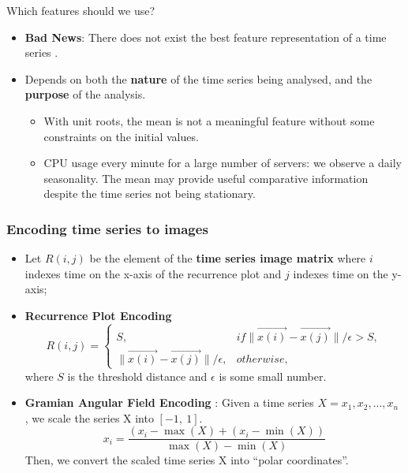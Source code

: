 \documentclass[10pt,aspectratio=43]{beamer}
\begin{document}
\begin{frame}{Which features should we use?}

  \begin{itemize}
  \item \textbf{Bad News}: There does not exist the best feature representation of a time series
    \citep{fulcher2018feature}.
  \item
    Depends on both the \textbf{nature} of the time series being analysed,
    and the \textbf{purpose} of the analysis.

    \begin{itemize}
    \item
      With unit roots, the mean is not a meaningful feature without some
      constraints on the initial values.
    \item
      CPU usage every minute for a large number of servers: we observe a
      daily seasonality. The mean may provide useful comparative
      information despite the time series not being stationary.
    \end{itemize}
  \end{itemize}

\end{frame}

\begin{frame}
  \frametitle{Encoding time series to images}

  \begin{itemize}
  \item Let $R(i,j)$ be the element of the \textbf{time series image matrix} where $i$
    indexes time on the x-axis of the recurrence plot and $j$ indexes time on the y-axis;
  \item  \textbf{Recurrence Plot Encoding}
\begin{equation*}
  R(i, j) = \begin{cases}
    S, & if \parallel \overrightarrow{x(i)} -\overrightarrow{x(j)}\parallel/\epsilon>S,\\
    \parallel \overrightarrow{x(i)} -\overrightarrow{x(j)}\parallel/\epsilon, & otherwise,
  \end{cases}
\end{equation*}
  where $S$ is the threshold distance and $\epsilon$ is some small number.

\item \textbf{Gramian Angular Field Encoding} \citep{wang2015Imaging}: Given a time series
  $X={x_{1},x_{2},...,x_{n}}$ , we scale the series X into $[-1,~1]$.
\begin{equation*}
 { x } _ { i } = \frac { \left( x _ { i } - \max ( X ) + \left( x _ { i } - \min ( X ) \right) \right. } { \max ( X ) - \min ( X ) }
\end{equation*}
Then, we convert the scaled time series X into ``polar coordinates''.

  \end{itemize}

\end{frame}
\end{document}
